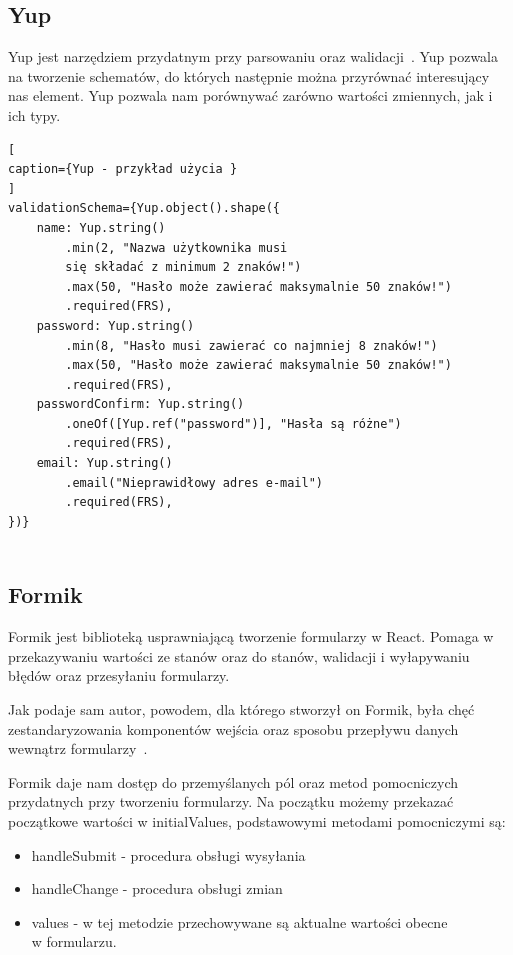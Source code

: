 \documentclass[oneside,polski,logo,indent]{amuthesis}
\begin{document}
\subsection{Yup}
Yup jest narzędziem przydatnym przy parsowaniu oraz walidacji~\cite{yup}. Yup pozwala na tworzenie schematów, do których następnie
można przyrównać interesujący nas element. Yup pozwala nam porównywać zarówno wartości zmiennych, jak i ich typy.

\begin{lstlisting}[
caption={Yup - przykład użycia }
]
validationSchema={Yup.object().shape({
	name: Yup.string()
		.min(2, "Nazwa użytkownika musi 
		się składać z minimum 2 znaków!")
		.max(50, "Hasło może zawierać maksymalnie 50 znaków!")
		.required(FRS),
	password: Yup.string()
		.min(8, "Hasło musi zawierać co najmniej 8 znaków!")
		.max(50, "Hasło może zawierać maksymalnie 50 znaków!")
		.required(FRS),
	passwordConfirm: Yup.string()
		.oneOf([Yup.ref("password")], "Hasła są różne")
		.required(FRS),
	email: Yup.string()
		.email("Nieprawidłowy adres e-mail")
		.required(FRS),
})}


\end{lstlisting}

\subsection{Formik}
Formik jest biblioteką usprawniającą tworzenie formularzy w React. Pomaga w przekazywaniu wartości ze stanów oraz do stanów, walidacji i wyłapywaniu błędów oraz przesyłaniu formularzy.

Jak podaje sam autor, powodem, dla którego stworzył on Formik, była chęć zestandaryzowania komponentów wejścia oraz sposobu przepływu danych wewnątrz formularzy~\cite{formik}.

Formik daje nam dostęp do przemyślanych pól oraz metod pomocniczych przydatnych przy tworzeniu formularzy. Na początku możemy przekazać początkowe wartości w initialValues, podstawowymi metodami pomocniczymi są:

\begin{itemize}
\item handleSubmit - procedura obsługi wysyłania
\item handleChange - procedura obsługi zmian
\item values - w tej metodzie przechowywane są aktualne wartości obecne  \\ w formularzu.
\end{itemize}
\end{document}
